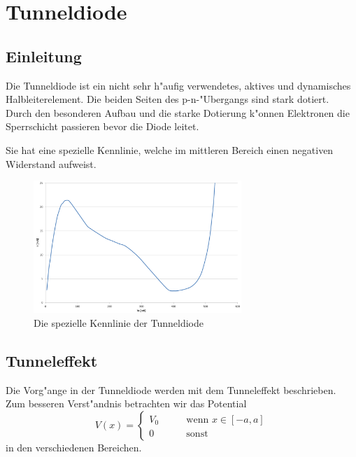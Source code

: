 \newcommand{\RM}[1]{\MakeUppercase{\romannumeral #1{}}}

\chapter{Tunneldiode\label{chapter:tunneldiode}}
\begin{refsection}

\newpage
\section{Einleitung}
Die Tunneldiode ist ein nicht sehr h"aufig verwendetes, aktives und dynamisches Halbleiterelement. Die beiden Seiten des p-n-"Ubergangs sind stark dotiert. Durch den besonderen Aufbau und die starke Dotierung k"onnen Elektronen die Sperrschicht passieren bevor die Diode leitet.

Sie hat eine spezielle Kennlinie, welche im mittleren Bereich einen negativen Widerstand aufweist.

\begin{figure}[h]	%
\centering
\includegraphics[width=0.7\textwidth]{tunneldiode/images/Tunneldiode.png}
\caption{Die spezielle Kennlinie der Tunneldiode
\label{skript:Tunneldiode}}
\end{figure}

\section{Tunneleffekt}
Die Vorg"ange in der Tunneldiode werden mit dem Tunneleffekt beschrieben. Zum besseren Verst"andnis betrachten wir das Potential 
\[
V(x)=\begin{cases}
V_0& \qquad \text{wenn } x \in [-a,a]\\
0&   \qquad \text{sonst}
\end{cases}
\]
in den verschiedenen Bereichen.


\end{refsection}
